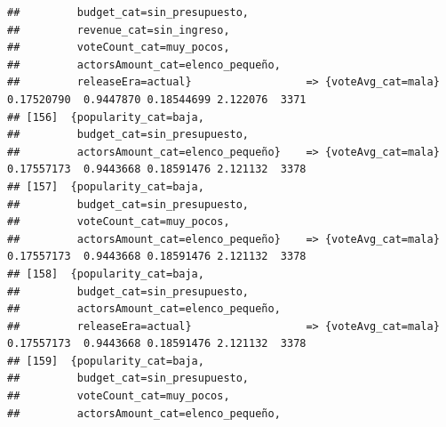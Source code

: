 \documentclass[
]{article}
\begin{document}
\begin{verbatim}
##         budget_cat=sin_presupuesto,                                                                                             
##         revenue_cat=sin_ingreso,                                                                                                
##         voteCount_cat=muy_pocos,                                                                                                
##         actorsAmount_cat=elenco_pequeño,                                                                                        
##         releaseEra=actual}                  => {voteAvg_cat=mala}                0.17520790  0.9447870 0.18544699 2.122076  3371
## [156]  {popularity_cat=baja,                                                                                                    
##         budget_cat=sin_presupuesto,                                                                                             
##         actorsAmount_cat=elenco_pequeño}    => {voteAvg_cat=mala}                0.17557173  0.9443668 0.18591476 2.121132  3378
## [157]  {popularity_cat=baja,                                                                                                    
##         budget_cat=sin_presupuesto,                                                                                             
##         voteCount_cat=muy_pocos,                                                                                                
##         actorsAmount_cat=elenco_pequeño}    => {voteAvg_cat=mala}                0.17557173  0.9443668 0.18591476 2.121132  3378
## [158]  {popularity_cat=baja,                                                                                                    
##         budget_cat=sin_presupuesto,                                                                                             
##         actorsAmount_cat=elenco_pequeño,                                                                                        
##         releaseEra=actual}                  => {voteAvg_cat=mala}                0.17557173  0.9443668 0.18591476 2.121132  3378
## [159]  {popularity_cat=baja,                                                                                                    
##         budget_cat=sin_presupuesto,                                                                                             
##         voteCount_cat=muy_pocos,                                                                                                
##         actorsAmount_cat=elenco_pequeño,                                                                                        

\end{verbatim}
\end{document}

